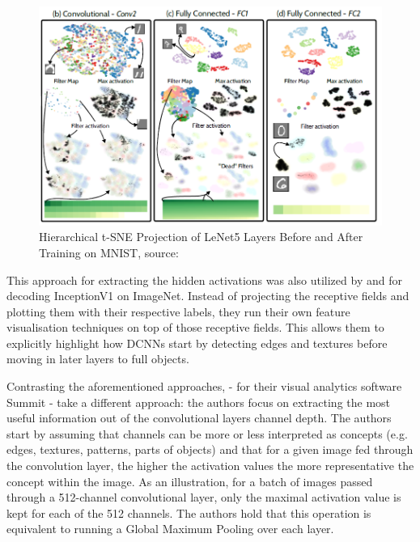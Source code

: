 \vspace{0.2cm}

\begin{figure}[H]
	\centering
	\includegraphics[scale=0.75]{images/embedding_view/HRV_Fig_007_Pezzotti_A.PNG}
	\caption{Hierarchical t-SNE Projection of LeNet5 Layers Before and After Training on MNIST, source: \cite{Pezzotti2018DeepEyesPV}}
	\label{fig:HRV_007_Pezzotti_A}
\end{figure}

\vspace{0.2cm}

This approach for extracting the hidden activations was also utilized by \cite{Carter2019} and \cite{Rathore2019TopoActET} for decoding InceptionV1 on ImageNet. Instead of projecting the receptive fields and plotting them with their respective labels, they run their own feature visualisation techniques on top of those receptive fields. This allows them to explicitly highlight how DCNNs start by detecting edges and textures before moving in later layers to full objects.

Contrasting the aforementioned approaches, \cite{hohman2020summit} - for their visual analytics software Summit - take a different approach: the authors focus on extracting the most useful information out of the convolutional layers channel depth. The authors start by assuming that channels can be more or less interpreted as concepts (e.g. edges, textures, patterns, parts of objects) and that for a given image fed through the convolution layer, the higher the activation values the more representative the concept within the image. As an illustration, for a batch of images passed through a 512-channel convolutional layer, only the maximal activation value is kept for each of the 512 channels. The authors hold that this operation is equivalent to running a Global Maximum Pooling over each layer.

